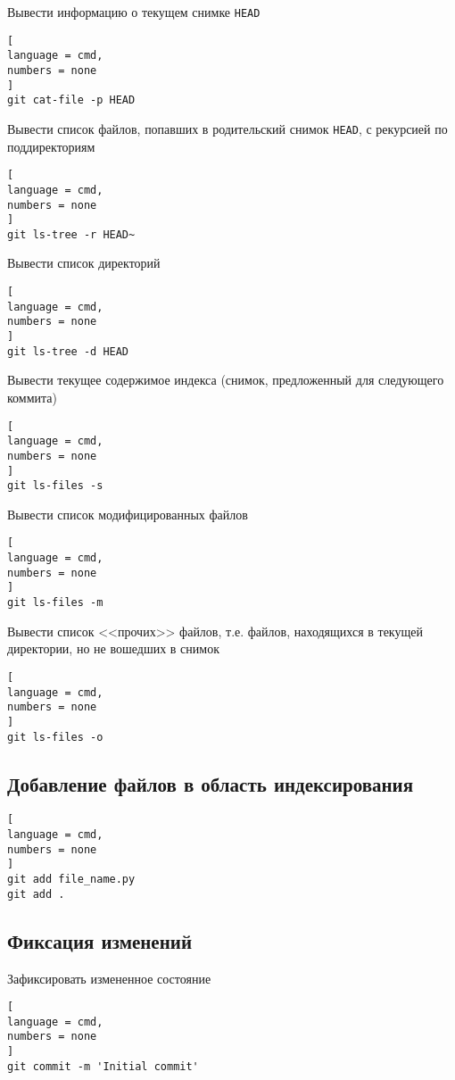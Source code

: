 \documentclass[%
	11pt,
	a4paper,
	utf8,
		]{article}
\begin{document}
Вывести информацию о текущем снимке \texttt{HEAD}
\begin{lstlisting}[
language = cmd,
numbers = none
]
git cat-file -p HEAD
\end{lstlisting}

Вывести список файлов, попавших в родительский снимок \texttt{HEAD}, с рекурсией по поддиректориям
\begin{lstlisting}[
language = cmd,
numbers = none
]
git ls-tree -r HEAD~
\end{lstlisting}

Вывести список директорий
\begin{lstlisting}[
language = cmd,
numbers = none
]
git ls-tree -d HEAD
\end{lstlisting}

Вывести текущее содержимое индекса (снимок, предложенный для следующего коммита)
\begin{lstlisting}[
language = cmd,
numbers = none
]
git ls-files -s
\end{lstlisting}

Вывести список модифицированных файлов
\begin{lstlisting}[
language = cmd,
numbers = none
]
git ls-files -m
\end{lstlisting}

Вывести список <<прочих>> файлов, т.е. файлов, находящихся в текущей директории, но не вошедших в снимок
\begin{lstlisting}[
language = cmd,
numbers = none
]
git ls-files -o
\end{lstlisting}


\subsection{Добавление файлов в область индексирования}

\begin{lstlisting}[
language = cmd,
numbers = none
]
git add file_name.py
git add .
\end{lstlisting}


\subsection{Фиксация изменений}

Зафиксировать измененное состояние

\begin{lstlisting}[
language = cmd,
numbers = none
]
git commit -m 'Initial commit'
\end{lstlisting}
\end{document}

